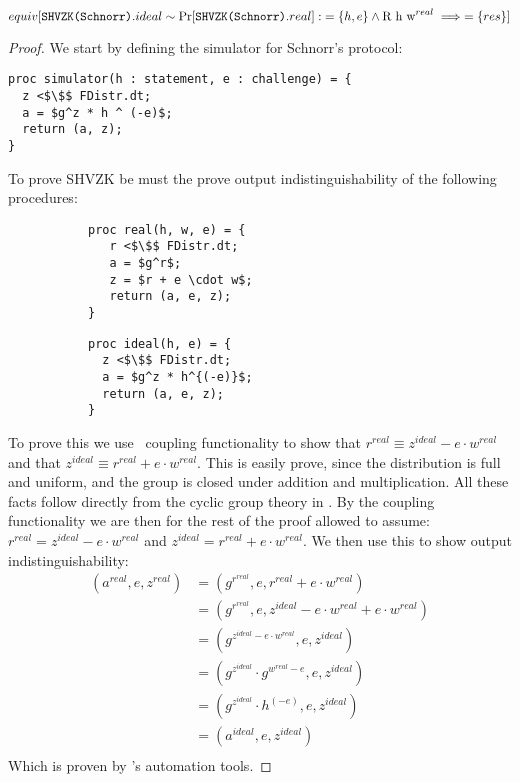\begin{lemma}
  \[
    equiv[\texttt{SHVZK(Schnorr)}.ideal \sim \operatorname{Pr}[\texttt{SHVZK(Schnorr)}.real] :\; =\{h,e\} \land \text{R h w}^{real} \implies =\{res\}]
  \]
\end{lemma}
\begin{proof}
  We start by defining the simulator for Schnorr's protocol:
\begin{lstlisting}[mathescape]
proc simulator(h : statement, e : challenge) = {
  z <$\$$ FDistr.dt;
  a = $g^z * h ^ (-e)$;
  return (a, z);
}
\end{lstlisting}
  To prove SHVZK be must the prove output indistinguishability of the following procedures:
  \begin{figure}[ht]
    \centering
    \begin{subfigure}{0.48\textwidth }
\begin{lstlisting}[mathescape]
proc real(h, w, e) = {
   r <$\$$ FDistr.dt;
   a = $g^r$;
   z = $r + e \cdot w$;
   return (a, e, z);
}
\end{lstlisting}
    \end{subfigure}
    \hfill
    \begin{subfigure}{0.48\textwidth }
\begin{lstlisting}[mathescape]
proc ideal(h, e) = {
  z <$\$$ FDistr.dt;
  a = $g^z * h^{(-e)}$;
  return (a, e, z);
}
\end{lstlisting}
    \end{subfigure}
  \end{figure}
  To prove this we use \easycrypt\ coupling functionality to show that $r^{real} \equiv z^{ideal} - e \cdot w^{real}$ and that $z^{ideal} \equiv r^{real} + e \cdot w^{real}$.
  This is easily prove, since the distribution is full and uniform, and the group is closed under addition and multiplication. All these facts follow directly from the cyclic group theory in \easycrypt.
  By the coupling functionality we are then for the rest of the proof allowed to assume:
  $r^{real} = z^{ideal} - e \cdot w^{real}$ and $z^{ideal} = r^{real} + e \cdot
  w^{real}$. We then use this to show output indistinguishability:
  \begin{align*}
    (a^{real}, e, z^{real}) &= (g^{r^{real}}, e, r^{real} + e \cdot w^{real}) \\
                          &= (g^{r^{real}}, e, z^{ideal} - e \cdot w^{real} + e \cdot w^{real}) \\
                          &= (g^{z^{ideal} - e \cdot w^{real}}, e, z^{ideal}) \\
                          &= (g^{z^{ideal}} \cdot g^{w^{real} - e}, e, z^{ideal}) \\
                          &= (g^{z^{ideal}} \cdot h^{(-e)}, e, z^{ideal}) \\
                          &= (a^{ideal}, e, z^{ideal}) \\
  \end{align*}
  Which is proven by \easycrypt's automation tools.
\end{proof}


